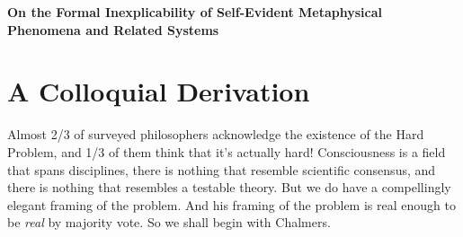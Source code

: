 \documentclass[runningheads]{llncs}
\begin{document}
\begin{center}
	{\Large\bfseries\boldmath
		On the Formal Inexplicability of Self-Evident Metaphysical Phenomena and Related Systems
		\par}
	\vskip 0.8cm
\end{center}

\begin{abstract}
Since Descartes first proclaimed "cogito, ergo sum" back in 1637, "I think, therefore I am" has become the Declaration of Independence for consciousness. Chalmers' informed us of the fact that science has a constitutionally \textit{Hard Problem} on their hands. If he's as right as we believe he is, conscious experience may forever elude our most powerful explanatory framework for physical phenomena. In other news, a group referring to themselves as the \textit{IIT-Concerned} recently proclaimed in Nature Neuroscience that any theory of consciousness that can't stand up to the scrutiny of science shall be deemed "unscientific." And the emergence of Semantic AI has transformed this philosophical oddity into a practical concern with real ethical implications. We simply cannot know whether AI systems are conscious without first knowing the necessary and sufficient conditions for consciousness. How can we provide a formal definition of conscious experience that preserves the essence of its metaphysical character in a framework that is physically falsifiable? 
		
\end{abstract}

\section{A Colloquial Derivation}

Almost 2/3 of surveyed philosophers acknowledge the existence of the Hard Problem, and 1/3 of them think that it's actually hard! \cite{BourgetChalmers2023} Consciousness is a field that spans disciplines, there is nothing that resemble scientific consensus, and there is nothing that resembles a testable theory. But we do have a compellingly elegant framing of the problem. And his framing of the problem is real enough to be \textit{real} by majority vote. So we shall begin with Chalmers.
\end{document}
